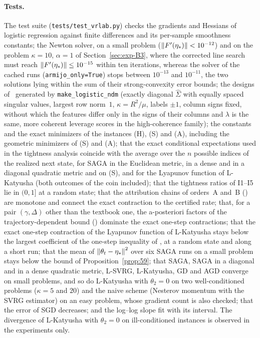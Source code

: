 \paragraph{Tests.} The test suite (\nolinkurl{tests/test_vrlab.py}) checks the gradients and Hessians of logistic
regression against finite differences and its per-sample smoothness constants; the Newton solver, on a small problem
($\left\|F'(\eta_\ast)\right\|<10^{-12}$) and on the problem $\kappa=10$, $\alpha=1$ of Section~\ref{sec:exp-B3}, where the
corrected line search must reach $\left\|F'(\eta_\ast)\right\|\le10^{-15}$ within ten iterations, whereas the solver of the
cached runs (\texttt{armijo\_only=True}) stops between $10^{-13}$ and $10^{-11}$, the two solutions lying within the sum
of their strong-convexity error bounds; the designs of~\cite{na2023hessian} generated by \nolinkurl{make_logistic_ndm}
(exactly diagonal $\hat\Sigma$ with equally spaced singular values, largest row norm~$1$, $\kappa=R^2/\mu$, labels
$\pm1$, column signs fixed, without which the features differ only in the signs of their columns and $\lambda$ is the
same, more coherent leverage scores in the high-coherence family);
the constants and the exact minimizers of the instances (H), (S) and (A), including the geometric minimizers of (S) and
(A); that the exact
conditional expectations used in the tightness analysis coincide with the average over the $n$ possible indices of the
realized next state, for SAGA in the Euclidean metric, in a dense and in a diagonal quadratic metric and on (S), and for
the Lyapunov function of L-Katyusha (both outcomes of the coin included); that the tightness ratios of I1--I5 lie in
$(0,1]$ at a random state; that the attribution chains of orders~A and~B () are monotone
and connect the exact contraction to the certified rate; that, for a pair $(\gamma,\Delta)$ other than the textbook
one, the a-posteriori factors of the trajectory-dependent bound () dominate the exact one-step
contractions; that the exact one-step contraction of the Lyapunov function of L-Katyusha stays below the largest
coefficient of the one-step inequality of , at a random state and along a short run; that the mean of
$\left\|\theta_t-\eta_\ast\right\|^2$ over six SAGA runs on a small problem stays below the bound of Proposition~\ref{prop:59};
that SAGA, SAGA in a diagonal and in a dense quadratic metric, L-SVRG, L-Katyusha, GD and AGD converge on small
problems, and so do L-Katyusha with $\theta_2=0$ on two well-conditioned problems ($\kappa=5$ and $20$) and the naive
scheme (Nesterov momentum with the SVRG estimator) on an easy problem, whose gradient count is also checked; that the
error of SGD decreases; and the log--log slope fit with its interval. The divergence of L-Katyusha with $\theta_2=0$ on
ill-conditioned instances is observed in the experiments only.

